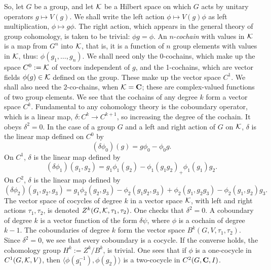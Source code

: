 So, let $G$ be a group, and let ${\cal K}$ be a Hilbert space on which
$G$ acts by unitary operators $g\mapsto V(g)$.
We shall write the left action $\phi\mapsto V(g)\phi$ as left
multiplication, $\phi\mapsto g\phi$. The right action, which appears in the
general theory of group cohomology, is taken to be trivial: $\phi g=\phi$.
An $n$-{\em cochain} with values in
${\cal K}$ is a map from
$G^n$ into ${\cal K}$, that is, it is a function of $n$ group elements
with values in ${\cal K}$, thus: $\phi(g_1,\ldots,g_n)$. We shall need
only the $0$-cochains, which make up the space $C^0:={\cal K}$ of vectors
independent of $g$, and the 1-cochains, which are vector fields $\phi(g)
\in{\cal K}$ defined on the group. These make up the vector space $C^1$.
We shall also need the  $2$-co-chains, when
${\cal K}={\bf C}$; these are complex-valued functions of two group
elements. We see that the cochains of any degree $k$ form a vector space
$C^k$. Fundamental to any cohomology theory is the coboundary operator,
which is a linear map, $\delta:C^k\rightarrow C^{k+1}$,
so increasing the degree of the cochain. It obeys $\delta^2=0$.
In the case of a group $G$ and a left and right action of $G$ on ${\cal K}$,
$\delta$ is the linear map defined on $C^0$ by
\[(\delta\phi_0)(g)=g\phi_0-\phi_0g.\]
On $C^1$, $\delta$ is the linear map defined by
\[(\delta\phi_1)(g_1,g_2)=g_1\phi_1(g_2)-\phi_1(g_1g_2)_+\phi_1(g_1)g_2.\]
On $C^2$, $\delta$ is the linear map defined by
\[(\delta\phi_2)(g_1,g_2,g_3)=g_1\phi_2(g_2,g_3)-\phi_2(g_1g_2,g_3)+
\phi_2(g_1,g_2g_3)-\phi_2(g_1,g_2)g_3.\]
The vector space of cocycles of degree $k$ in a vector space ${\cal K}$, with
left and right actions $\tau_1,\tau_2$, is denoted $Z^k(G,{\cal K},\tau_1,
\tau_2)$. One checks that $\delta^2=0$. A coboundary of degree $k$
is a vector function
of the form $\delta\psi$, where $\phi$ is a cochain of degree $k-1$.
The coboundaries of degree $k$ form the vector space $B^k(G,V,
\tau_1,\tau_2)$. Since $\delta^2=0$, we see that every coboundary is a
cocycle. If the converse holds, the cohomology group $H^k:=Z^k/B^k$,
is trivial.
One sees that if $\phi$ is a one-cocycle in $C^1(G,
{\cal K},V)$, then $\langle\phi(g_1^{-1}),\phi(g_2)\rangle$ is a two-cocycle
in $C^2(G,{\bf C},I)$.


